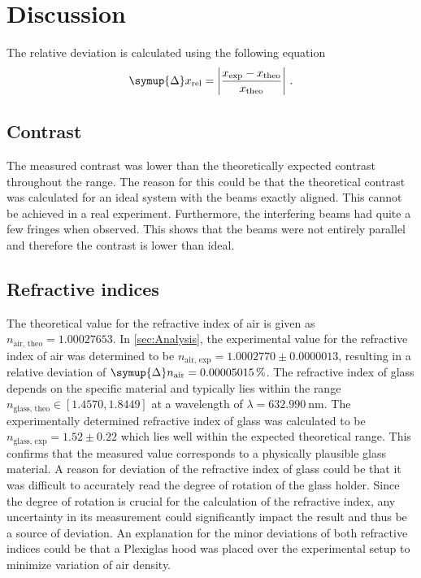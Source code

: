 \section{Discussion}
\label{sec:Discussion}
The relative deviation is calculated using the following equation
\begin{equation*}
    \symup{\Delta} x_{\text{rel}} = \left| \frac{x_{\text{exp}} - x_{{\text{theo}}}}{x_{{\text{theo}}}}\right|\,.
\end{equation*}
\subsection{Contrast}
The measured contrast was lower than the theoretically expected contrast throughout the range. The reason for this could be 
that the theoretical contrast was calculated for an ideal system with the beams exactly aligned. This cannot be achieved in 
a real experiment. Furthermore, the interfering beams had quite a few fringes when observed. This shows that the beams 
were not entirely parallel and therefore the contrast is lower than ideal. 

\subsection{Refractive indices}
The theoretical value for the refractive index of air is given as $n_{\text{air, theo}}=1.00027653$. 
In \autoref{sec:Analysis}, the experimental value for the refractive index of air was determined to be 
$n_{\text{air, exp}} = 1.0002770\pm0.0000013$, resulting in a relative deviation of $\symup{\Delta}n_{\text{air}} = 0.00005015\,\%$. 
The refractive index of 
glass depends on the specific material and typically lies within the range $n_{\text{glass, theo}}\in [1.4570, 1.8449]$ at a 
wavelength of $\lambda = \SI{632.990}{\nano\meter}$. 
The experimentally determined refractive index of glass was calculated to be $n_{\text{glass, exp}} = 1.52\pm0.22$ which lies 
well within the expected theoretical range. 
This confirms that the measured value corresponds to a physically plausible glass material.
A reason for deviation of the refractive index of glass could be that it was difficult to accurately read the degree of rotation 
of the glass holder. 
Since the degree of rotation is crucial for the calculation of the refractive index, any uncertainty in its measurement could significantly impact the result and thus be a source of deviation.
An explanation for the minor deviations of both refractive indices could be that a Plexiglas hood was placed over the 
experimental setup to minimize 
variation of air density.